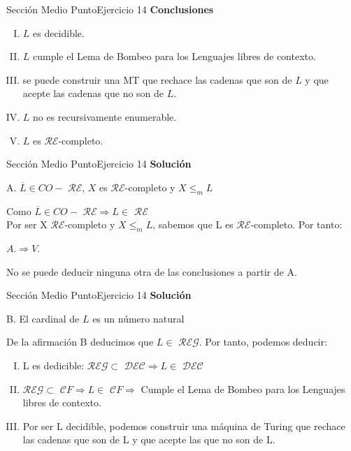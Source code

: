 \documentclass[10pt, envcountsect, presentation, aspectratio=169]{beamer}
\newcommand{\lreg}{\ensuremath{\mathcal {REG}}}
\newcommand{\lcf}{\ensuremath{\mathcal CF}}
\newcommand{\ld}{\ensuremath{\mathcal {DEC}}}
\newcommand{\lr}{\ensuremath{\mathcal {RE}}}
\begin{document}

\begin{frame}{Sección Medio Punto}{Ejercicio 14}
    \textbf{Conclusiones}
    \begin{enumerate}[I.]
        \item $L$ es  decidible.
        \item $L$ cumple el Lema de Bombeo para los Lenguajes  libres de contexto.
        \item se puede construir una MT que rechace las cadenas que son de $L$ y que acepte las cadenas que no son de $L$.
        \item $L$ no es recursivamente enumerable.
        \item $L$ es \lr-completo. 
    \end{enumerate}
\end{frame}




\begin{frame}{Sección Medio Punto}{Ejercicio 14}
    \textbf{Solución}\\
     \begin{center}
        A. $\overline{L} \in CO-$ \lr, $X$ es \lr-completo y $X \le_m  L$
    \end{center}
    Como $\overline{L} \in CO-$ \lr $\Rightarrow L\in$ \lr \\ 
    Por ser X \lr-completo y $X \leq_m L$, sabemos que L es \lr-completo. Por tanto:\\
    \begin{center}
        $A. \Rightarrow V.$
    \end{center}
    No se puede deducir ninguna otra de las conclusiones a partir de A.
\end{frame}

\begin{frame}{Sección Medio Punto}{Ejercicio 14}
    \textbf{Solución}\\
     \begin{center}
        B. El cardinal de $L$ es un número natural
    \end{center}
    De la afirmación B deducimos que $L \in$ \lreg. Por tanto, podemos deducir:
    \begin{enumerate}[I.]
        \item L es dedicible: \lreg $\subset$ \ld $\Rightarrow L \in$ \ld
        \item \lreg $\subset$ \lcf $\Rightarrow L \in$ \lcf $\Rightarrow$ Cumple el Lema de Bombeo para los Lenguajes libres de contexto.
        \item Por ser L decidible, podemos construir una máquina de Turing que rechace las cadenas que son de L y que acepte las que no son de L.
    \end{enumerate}
\end{frame}
\end{document}
